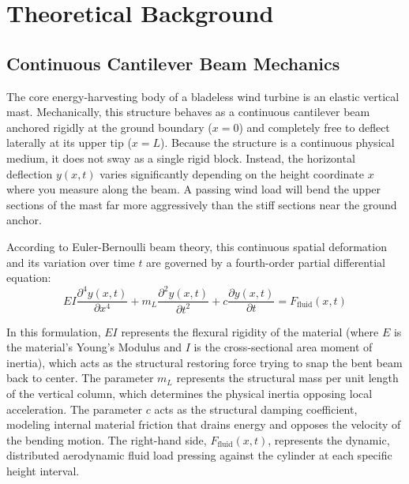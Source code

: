 \documentclass[11pt,a4paper]{article}
\begin{document}
\section{Theoretical Background}
\label{sec:theoretical_background}

\subsection{Continuous Cantilever Beam Mechanics}
The core energy-harvesting body of a bladeless wind turbine is an elastic vertical mast. Mechanically, this structure behaves as a continuous cantilever beam anchored rigidly at the ground boundary ($x = 0$) and completely free to deflect laterally at its upper tip ($x = L$). Because the structure is a continuous physical medium, it does not sway as a single rigid block. Instead, the horizontal deflection $y(x,t)$ varies significantly depending on the height coordinate $x$ where you measure along the beam. A passing wind load will bend the upper sections of the mast far more aggressively than the stiff sections near the ground anchor.

According to Euler-Bernoulli beam theory, this continuous spatial deformation and its variation over time $t$ are governed by a fourth-order partial differential equation:
\begin{equation}
EI \frac{\partial^4 y(x,t)}{\partial x^4} + m_L \frac{\partial^2 y(x,t)}{\partial t^2} + c \frac{\partial y(x,t)}{\partial t} = F_{\text{fluid}}(x,t)
\end{equation}

In this formulation, $EI$ represents the flexural rigidity of the material (where $E$ is the material's Young's Modulus and $I$ is the cross-sectional area moment of inertia), which acts as the structural restoring force trying to snap the bent beam back to center. The parameter $m_L$ represents the structural mass per unit length of the vertical column, which determines the physical inertia opposing local acceleration. The parameter $c$ acts as the structural damping coefficient, modeling internal material friction that drains energy and opposes the velocity of the bending motion. The right-hand side, $F_{\text{fluid}}(x,t)$, represents the dynamic, distributed aerodynamic fluid load pressing against the cylinder at each specific height interval.
\end{document}
